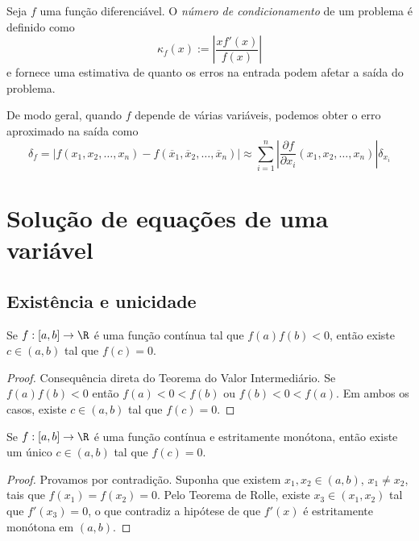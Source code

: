 \documentclass{article}
\begin{document}
\begin{defn}
    Seja \(f\) uma função diferenciável. O \emph{número de condicionamento} de um problema é definido como
    \begin{equation}
        \kappa_f(x) := \left\vert \frac{xf'(x)}{f(x)} \right\vert
    \end{equation}
    \noindent e fornece uma estimativa de quanto os erros na entrada podem afetar a saída do problema.
\end{defn}

\begin{rem}
    De modo geral, quando \(f\) depende de várias variáveis, podemos obter o erro aproximado na saída como
    \begin{equation}
        \delta_f = \vert f(x_1, x_2, \ldots, x_n) - f(\overline{x}_1, \overline{x}_2, \ldots, \overline{x}_n) \vert \approx \sum_{i=1}^{n} \left\vert \frac{\partial f}{\partial x_i} (x_1, x_2, \ldots, x_n)\right\vert \delta_{x_i}
    \end{equation}
\end{rem}

\section{Solução de equações de uma variável}

\subsection{Existência e unicidade}



\begin{thm} [Bolzano] \label{thm:bolzano}
    Se \(f: [a,b] \to \R\) é uma função contínua tal que \(f(a)f(b) < 0\), então existe \(c \in (a,b)\) tal que \(f(c) = 0\).
\end{thm}

\begin{proof}
    Consequência direta do Teorema do Valor Intermediário. Se \(f(a)f(b) <0\) então \(f(a)<0<f(b)\) ou \(f(b)<0<f(a)\). Em ambos os casos, existe \(c \in (a,b)\) tal que \(f(c)=0\).
\end{proof}

\begin{prop}
    Se \(f: [a,b] \to \R\) é uma função contínua e estritamente monótona, então existe um único \(c \in (a,b)\) tal que \(f(c) = 0\).
\end{prop}

\begin{proof}
    Provamos por contradição. Suponha que existem \(x_1, x_2 \in (a,b)\), \(x_1 \neq x_2\), tais que \(f(x_1)=f(x_2)=0\). Pelo Teorema de Rolle, existe \(x_3 \in (x_1, x_2)\) tal que \(f'(x_3) = 0\), o que contradiz a hipótese de que \(f'(x)\) é estritamente monótona em \((a,b)\).
\end{proof}
\end{document}
